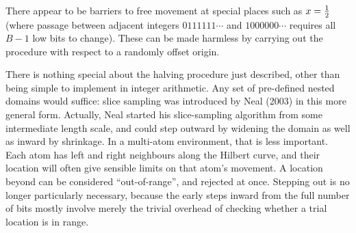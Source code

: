 \centerline{
\vbox{}}
\noindent
There appear to be barriers to free movement at special places such as $x = {1\over2}$
(where passage between adjacent integers $0111111\cdots$ and $1000000\cdots$ requires all $B-1$ low bits to change).
These can be made harmless by carrying out the procedure with respect to a randomly offset origin.

There is nothing special about the halving procedure just described, other than being simple to implement in integer arithmetic.
Any set of pre-defined nested domains would suffice: slice sampling was introduced by Neal (2003)  in this more general form.
Actually, Neal started his slice-sampling algorithm from some intermediate length scale, 
and could step outward by widening the domain as well as inward by shrinkage.
In a multi-atom environment, that is less important.
Each atom has left and right neighbours along the Hilbert curve, and their location will often give sensible limits on that atom's movement.
A location beyond can be considered ``out-of-range'', and rejected at once.
Stepping out is no longer particularly necessary, because the early steps inward from the full number of bits 
mostly involve merely the trivial overhead of checking whether a trial location is in range.

